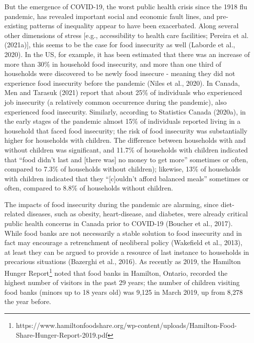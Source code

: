 \documentclass[]{elsarticle} %
\begin{document}
But the emergence of COVID-19, the worst public health crisis since the
1918 flu pandemic, has revealed important social and economic fault
lines, and pre-existing patterns of inequality appear to have been
exacerbated. Along several other dimensions of stress {[}e.g.,
accessibility to health care facilities; Pereira et al. (2021a){]}, this
seems to be the case for food insecurity as well (Laborde et al., 2020).
In the US, for example, it has been estimated that there was an increase
of more than 30\% in household food insecurity, and more than one third
of households were discovered to be newly food insecure - meaning they
did not experience food insecurity before the pandemic (Niles et al.,
2020). In Canada, Men and Tarasuk (2021) report that about 25\% of
individuals who experienced job insecurity (a relatively common
occurrence during the pandemic), also experienced food insecurity.
Similarly, according to Statistics Canada (2020a), in the early stages
of the pandemic almost 15\% of individuals reported living in a
household that faced food insecurity; the risk of food insecurity was
substantially higher for households with children. The difference
between households with and without children was significant, and 11.7\%
of households with children indicated that ``food didn't last and
{[}there was{]} no money to get more'' sometimes or often, compared to
7.3\% of households without children); likewise, 13\% of households with
children indicated that they ``{[}c{]}ouldn't afford balanced meals''
sometimes or often, compared to 8.8\% of households without children.

The impacts of food insecurity during the pandemic are alarming, since
diet-related diseases, such as obesity, heart-disease, and diabetes,
were already critical public health concerns in Canada prior to COVID-19
(Boucher et al., 2017). While food banks are not necessarily a stable
solution to food insecurity and in fact may encourage a retrenchment of
neoliberal policy (Wakefield et al., 2013), at least they can be argued
to provide a resource of last instance to households in precarious
situations (Bazerghi et al., 2016). As recently as 2019, the Hamilton
Hunger Report\footnote{https://www.hamiltonfoodshare.org/wp-content/uploads/Hamilton-Food-Share-Hunger-Report-2019.pdf}
noted that food banks in Hamilton, Ontario, recorded the highest number
of visitors in the past 29 years; the number of children visiting food
banks (minors up to 18 years old) was 9,125 in March 2019, up from 8,278
the year before.
\end{document}

